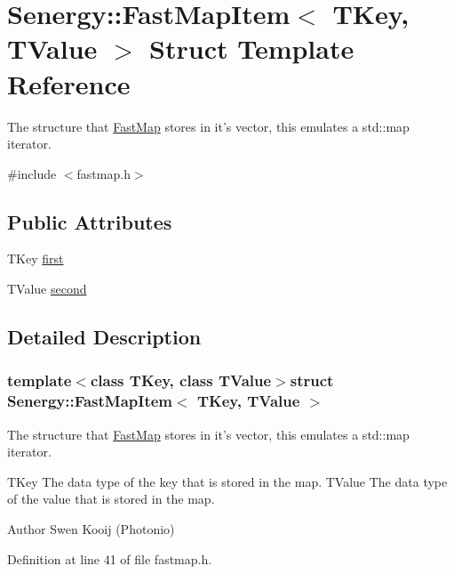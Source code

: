 \hypertarget{struct_senergy_1_1_fast_map_item}{\section{Senergy\-:\-:Fast\-Map\-Item$<$ T\-Key, T\-Value $>$ Struct Template Reference}
\label{struct_senergy_1_1_fast_map_item}
}


The structure that \hyperlink{class_senergy_1_1_fast_map}{Fast\-Map} stores in it's vector, this emulates a std\-::map iterator.  




{\ttfamily \#include $<$fastmap.\-h$>$}

\subsection*{Public Attributes}
\begin{DoxyCompactItemize}
\item 
T\-Key \hyperlink{struct_senergy_1_1_fast_map_item_a99e39296732f934331d581936e2ddb26}{first}
\item 
T\-Value \hyperlink{struct_senergy_1_1_fast_map_item_a685a9e654410404e550d65acd951c7ca}{second}
\end{DoxyCompactItemize}


\subsection{Detailed Description}
\subsubsection*{template$<$class T\-Key, class T\-Value$>$struct Senergy\-::\-Fast\-Map\-Item$<$ T\-Key, T\-Value $>$}

The structure that \hyperlink{class_senergy_1_1_fast_map}{Fast\-Map} stores in it's vector, this emulates a std\-::map iterator. 

T\-Key The data type of the key that is stored in the map.  T\-Value The data type of the value that is stored in the map.

\begin{DoxyAuthor}{Author}
Swen Kooij (Photonio) 
\end{DoxyAuthor}


Definition at line 41 of file fastmap.\-h.



